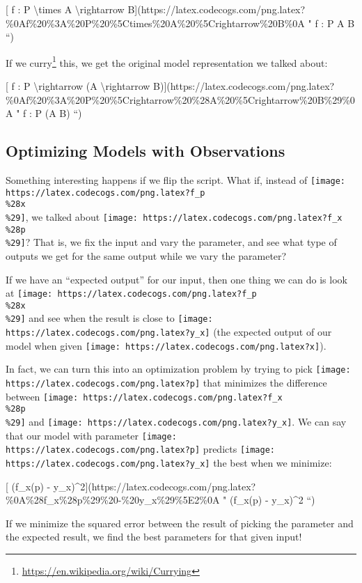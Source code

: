\documentclass[]{article}
\renewcommand{\href}[2]{#2\footnote{\url{#1}}}
\begin{document}
{[} f : P \textbackslash{}times A \textbackslash{}rightarrow
B{]}(https://latex.codecogs.com/png.latex?\%0Af\%20\%3A\%20P\%20\%5Ctimes\%20A\%20\%5Crightarrow\%20B\%0A
" f : P \times A \rightarrow B ``)

If we \href{https://en.wikipedia.org/wiki/Currying}{curry} this, we get the
original model representation we talked about:

{[} f : P \textbackslash{}rightarrow (A \textbackslash{}rightarrow
B){]}(https://latex.codecogs.com/png.latex?\%0Af\%20\%3A\%20P\%20\%5Crightarrow\%20\%28A\%20\%5Crightarrow\%20B\%29\%0A
" f : P \rightarrow (A \rightarrow B) ``)

\hypertarget{optimizing-models-with-observations}{%
\subsection{Optimizing Models with
Observations}\label{optimizing-models-with-observations}}

Something interesting happens if we flip the script. What if, instead of
\texttt{[image: https://latex.codecogs.com/png.latex?f\_p\\\%28x\\\%29]}, we talked
about \texttt{[image: https://latex.codecogs.com/png.latex?f\_x\\\%28p\\\%29]}? That
is, we fix the input and vary the parameter, and see what type of outputs we get
for the same output while we vary the parameter?

If we have an ``expected output'' for our input, then one thing we can do is
look at \texttt{[image: https://latex.codecogs.com/png.latex?f\_p\\\%28x\\\%29]} and
see when the result is close to
\texttt{[image: https://latex.codecogs.com/png.latex?y\_x]} (the expected output
of our model when given
\texttt{[image: https://latex.codecogs.com/png.latex?x]}).

In fact, we can turn this into an optimization problem by trying to pick
\texttt{[image: https://latex.codecogs.com/png.latex?p]} that minimizes the
difference between
\texttt{[image: https://latex.codecogs.com/png.latex?f\_x\\\%28p\\\%29]} and
\texttt{[image: https://latex.codecogs.com/png.latex?y\_x]}. We can say that our
model with parameter \texttt{[image: https://latex.codecogs.com/png.latex?p]}
predicts \texttt{[image: https://latex.codecogs.com/png.latex?y\_x]} the best
when we minimize:

{[} (f\_x(p) -
y\_x)\^{}2{]}(https://latex.codecogs.com/png.latex?\%0A\%28f\_x\%28p\%29\%20-\%20y\_x\%29\%5E2\%0A
" (f\_x(p) - y\_x)\^{}2 ``)

If we minimize the squared error between the result of picking the parameter and
the expected result, we find the best parameters for that given input!
\end{document}
